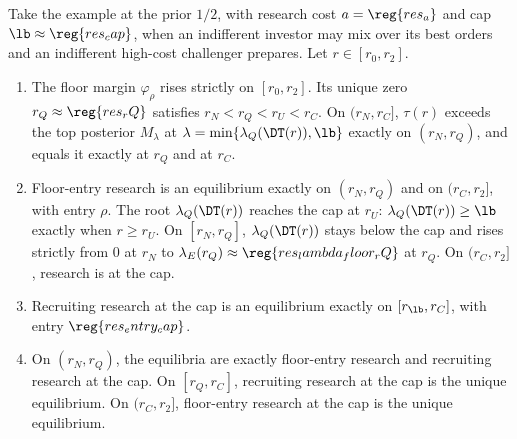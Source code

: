 \begin{lemma}\label{lem:a5-floor}
Take the example at the prior \(1/2\), with research cost \(a=\reg{res_a}\) and cap \(\lb\approx\reg{res_cap}\), when an
indifferent investor may mix over its best orders and an indifferent high-cost challenger prepares. Let
\(r\in[r_0,r_2]\).
\begin{enumerate}[label=(\alph*),leftmargin=2em]
\item The floor margin \(\varphi_\rho\) rises strictly on \([r_0,r_2]\). Its unique zero \(r_Q\approx\reg{res_rQ}\)
satisfies \(r_N<r_Q<r_U<r_C\). On \((r_N,r_C]\), \(\tau(r)\) exceeds the top posterior \(M_\lambda\) at
\(\lambda=\min\{\lambda_Q(\DT(r)),\lb\}\) exactly on \((r_N,r_Q)\), and equals it exactly at \(r_Q\) and at \(r_C\).
\item Floor-entry research is an equilibrium exactly on \((r_N,r_Q)\) and on \((r_C,r_2]\), with entry \(\rho\). The
root \(\lambda_Q(\DT(r))\) reaches the cap at \(r_U\): \(\lambda_Q(\DT(r))\ge\lb\) exactly when \(r\ge r_U\). On
\([r_N,r_Q]\), \(\lambda_Q(\DT(r))\) stays below the cap and rises strictly from \(0\) at \(r_N\) to
\(\lambda_E(r_Q)\approx\reg{res_lambda_floor_rQ}\) at \(r_Q\). On \((r_C,r_2]\), research is at the cap.
\item Recruiting research at the cap is an equilibrium exactly on \([r_{\lb},r_C]\), with entry
\(\reg{res_entry_cap}\).
\item On \((r_N,r_Q)\), the equilibria are exactly floor-entry research and recruiting research at the cap. On
\([r_Q,r_C]\), recruiting research at the cap is the unique equilibrium. On \((r_C,r_2]\), floor-entry research at
the cap is the unique equilibrium.
\end{enumerate}
\end{lemma}

